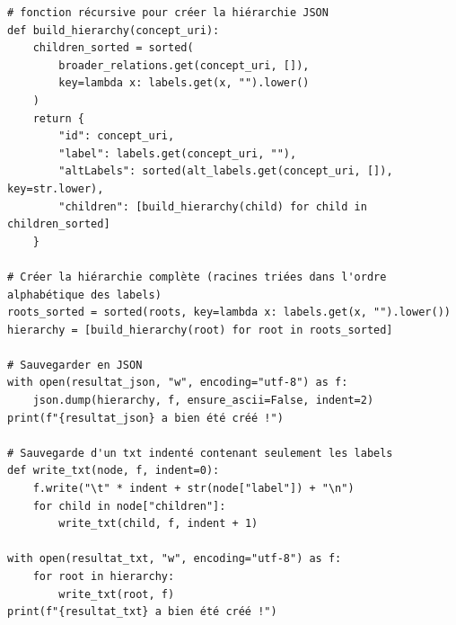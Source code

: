 \begin{verbatim}
# fonction récursive pour créer la hiérarchie JSON
def build_hierarchy(concept_uri):
    children_sorted = sorted(
        broader_relations.get(concept_uri, []),
        key=lambda x: labels.get(x, "").lower()
    )
    return {
        "id": concept_uri,
        "label": labels.get(concept_uri, ""),
        "altLabels": sorted(alt_labels.get(concept_uri, []), key=str.lower),
        "children": [build_hierarchy(child) for child in children_sorted]
    }

# Créer la hiérarchie complète (racines triées dans l'ordre alphabétique des labels)
roots_sorted = sorted(roots, key=lambda x: labels.get(x, "").lower())
hierarchy = [build_hierarchy(root) for root in roots_sorted]

# Sauvegarder en JSON
with open(resultat_json, "w", encoding="utf-8") as f:
    json.dump(hierarchy, f, ensure_ascii=False, indent=2)
print(f"{resultat_json} a bien été créé !")

# Sauvegarde d'un txt indenté contenant seulement les labels
def write_txt(node, f, indent=0):
    f.write("\t" * indent + str(node["label"]) + "\n")
    for child in node["children"]:
        write_txt(child, f, indent + 1)

with open(resultat_txt, "w", encoding="utf-8") as f:
    for root in hierarchy:
        write_txt(root, f)
print(f"{resultat_txt} a bien été créé !")
\end{verbatim}
